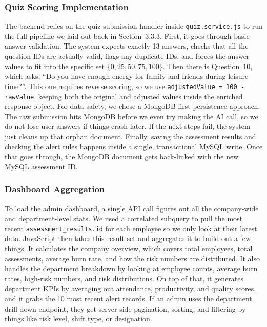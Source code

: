 \documentclass[12pt,a4paper]{article}
\begin{document}
\subsubsection{Quiz Scoring Implementation}

The backend relies on the quiz submission handler inside \texttt{quiz.service.js} to run the full pipeline we laid out back in Section~3.3.3. First, it goes through basic answer validation. The system expects exactly 13 answers, checks that all the question IDs are actually valid, flags any duplicate IDs, and forces the answer values to fit into the specific set $\{0, 25, 50, 75, 100\}$. Then there is Question~10, which asks, ``Do you have enough energy for family and friends during leisure time?''. This one requires reverse scoring, so we use \texttt{adjustedValue = 100 - rawValue}, keeping both the original and adjusted values inside the enriched response object. For data safety, we chose a MongoDB-first persistence approach. The raw submission hits MongoDB before we even try making the AI call, so we do not lose user answers if things crash later. If the next steps fail, the system just cleans up that orphan document. Finally, saving the assessment results and checking the alert rules happens inside a single, transactional MySQL write. Once that goes through, the MongoDB document gets back-linked with the new MySQL assessment ID.

\subsubsection{Dashboard Aggregation}

To load the admin dashboard, a single API call figures out all the company-wide and department-level stats. We used a correlated subquery to pull the most recent \texttt{assessment\_results.id} for each employee so we only look at their latest data. JavaScript then takes this result set and aggregates it to build out a few things. It calculates the company overview, which covers total employees, total assessments, average burn rate, and how the risk numbers are distributed. It also handles the department breakdown by looking at employee counts, average burn rates, high-risk numbers, and risk distributions. On top of that, it generates department KPIs by averaging out attendance, productivity, and quality scores, and it grabs the 10 most recent alert records. If an admin uses the department drill-down endpoint, they get server-side pagination, sorting, and filtering by things like risk level, shift type, or designation.
\end{document}
